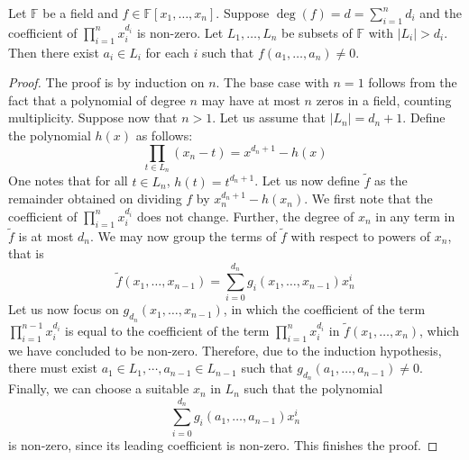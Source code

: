 \begin{theorem}
Let $\mathbb{F}$ be a field and $f\in\mathbb{F}[x_1,\ldots,x_n]$. Suppose $\deg(f) = d = \sum_{i=1}^nd_i$ and the coefficient of $\prod_{i=1}^nx_i^{d_i}$ is non-zero. Let $L_1,\ldots,L_n$ be subsets of $\mathbb{F}$ with $|L_i| > d_i$. Then there exist $a_i\in L_i$ for each $i$ such that $f(a_1,\ldots,a_n)\ne0$.
\end{theorem}
\begin{proof}
    The proof is by induction on $n$. The base case with $n = 1$ follows from the fact that a polynomial of degree $n$ may have at most $n$ zeros in a field, counting multiplicity. Suppose now that $n > 1$. Let us assume that $|L_n| = d_n + 1$. Define the polynomial $h(x)$ as follows:
    \begin{equation*}
        \prod_{t\in L_n}(x_n - t) = x^{d_n + 1} - h(x)
    \end{equation*}
    One notes that for all $t\in L_n$, $h(t) = t^{d_n + 1}$. Let us now define $\tilde{f}$ as the remainder obtained on dividing $f$ by $x_n^{d_n + 1} - h(x_n)$. We first note that the coefficient of $\prod_{i=1}^nx_i^{d_i}$ does not change. Further, the degree of $x_n$ in any term in $\tilde{f}$ is at most $d_n$. We may now group the terms of $\tilde{f}$ with respect to powers of $x_n$, that is 
    \begin{equation*}
        \tilde{f}(x_1,\ldots,x_{n - 1}) = \sum_{i=0}^{d_n}g_i(x_1,\ldots,x_{n-1})x_n^i
    \end{equation*}
    Let us now focus on $g_{d_n}(x_1,\ldots,x_{n-1})$, in which the coefficient of the term $\prod_{i=1}^{n - 1}x_i^{d_i}$ is equal to the coefficient of the term $\prod_{i=1}^{n}x_i^{d_i}$ in $\tilde{f}(x_1,\ldots,x_n)$, which we have concluded to be non-zero. Therefore, due to the induction hypothesis, there must exist $a_1\in L_1,\cdots,a_{n-1}\in L_{n - 1}$ such that $g_{d_n}(a_1,\ldots,a_{n - 1})\ne0$. Finally, we can choose a suitable $x_n$ in $L_n$ such that the polynomial 
    \begin{equation*}
        \sum_{i=0}^{d_n}g_i(a_1,\ldots,a_{n-1})x_n^i
    \end{equation*}
    is non-zero, since its leading coefficient is non-zero. This finishes the proof.
\end{proof}

